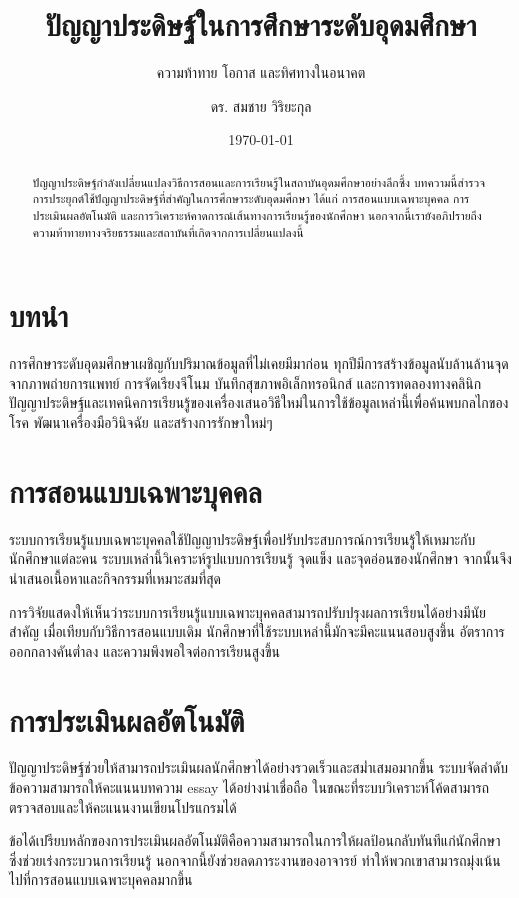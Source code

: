 \documentclass[
    language=thai,
    doctype=article,
]{../../omnilatex}
\title{ปัญญาประดิษฐ์ในการศึกษาระดับอุดมศึกษา}
\subtitle{ความท้าทาย โอกาส และทิศทางในอนาคต}
\author{ดร. สมชาย วิริยะกุล}
\date{\today}
\begin{document}
\maketitle

\begin{abstract}
ปัญญาประดิษฐ์กำลังเปลี่ยนแปลงวิธีการสอนและการเรียนรู้ในสถาบันอุดมศึกษาอย่างลึกซึ้ง บทความนี้สำรวจการประยุกต์ใช้ปัญญาประดิษฐ์ที่สำคัญในการศึกษาระดับอุดมศึกษา ได้แก่ การสอนแบบเฉพาะบุคคล การประเมินผลอัตโนมัติ และการวิเคราะห์คาดการณ์เส้นทางการเรียนรู้ของนักศึกษา นอกจากนี้เรายังอภิปรายถึงความท้าทายทางจริยธรรมและสถาบันที่เกิดจากการเปลี่ยนแปลงนี้
\end{abstract}

\section{บทนำ}
การศึกษาระดับอุดมศึกษาเผชิญกับปริมาณข้อมูลที่ไม่เคยมีมาก่อน ทุกปีมีการสร้างข้อมูลนับล้านล้านจุดจากภาพถ่ายการแพทย์ การจัดเรียงจีโนม บันทึกสุขภาพอิเล็กทรอนิกส์ และการทดลองทางคลินิก ปัญญาประดิษฐ์และเทคนิคการเรียนรู้ของเครื่องเสนอวิธีใหม่ในการใช้ข้อมูลเหล่านี้เพื่อค้นพบกลไกของโรค พัฒนาเครื่องมือวินิจฉัย และสร้างการรักษาใหม่ๆ

\section{การสอนแบบเฉพาะบุคคล}
ระบบการเรียนรู้แบบเฉพาะบุคคลใช้ปัญญาประดิษฐ์เพื่อปรับประสบการณ์การเรียนรู้ให้เหมาะกับนักศึกษาแต่ละคน ระบบเหล่านี้วิเคราะห์รูปแบบการเรียนรู้ จุดแข็ง และจุดอ่อนของนักศึกษา จากนั้นจึงนำเสนอเนื้อหาและกิจกรรมที่เหมาะสมที่สุด

การวิจัยแสดงให้เห็นว่าระบบการเรียนรู้แบบเฉพาะบุคคลสามารถปรับปรุงผลการเรียนได้อย่างมีนัยสำคัญ เมื่อเทียบกับวิธีการสอนแบบเดิม นักศึกษาที่ใช้ระบบเหล่านี้มักจะมีคะแนนสอบสูงขึ้น อัตราการออกกลางคันต่ำลง และความพึงพอใจต่อการเรียนสูงขึ้น

\section{การประเมินผลอัตโนมัติ}
ปัญญาประดิษฐ์ช่วยให้สามารถประเมินผลนักศึกษาได้อย่างรวดเร็วและสม่ำเสมอมากขึ้น ระบบจัดลำดับข้อความสามารถให้คะแนนบทความ essay ได้อย่างน่าเชื่อถือ ในขณะที่ระบบวิเคราะห์โค้ดสามารถตรวจสอบและให้คะแนนงานเขียนโปรแกรมได้

ข้อได้เปรียบหลักของการประเมินผลอัตโนมัติคือความสามารถในการให้ผลป้อนกลับทันทีแก่นักศึกษา ซึ่งช่วยเร่งกระบวนการเรียนรู้ นอกจากนี้ยังช่วยลดภาระงานของอาจารย์ ทำให้พวกเขาสามารถมุ่งเน้นไปที่การสอนแบบเฉพาะบุคคลมากขึ้น
\end{document}
